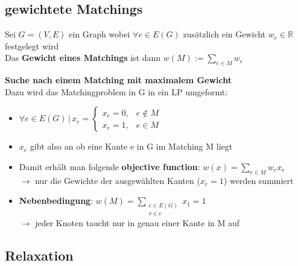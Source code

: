 \documentclass[12pt,a4paper]{article}
\begin{document}
\subsection{gewichtete Matchings}
Sei $G=(V,E)$ ein Graph wobei $\forall e\in E(G)$ zusätzlich ein Gewicht $w_e \in \mathbb{R}$ festgelegt wird\\
Das \textbf{Gewicht eines Matchings} ist dann $\displaystyle w(M) := \sum_{e\in M} w_e$

\textbf{Suche nach einem Matching mit maximalem Gewicht}\\
Dazu wird das Matchingproblem in G in ein LP umgeformt:
\begin{itemize}
\item $\forall e \in E(G) \, | \, x_e = \begin{cases} x_e = 0, & e \not\in M\\ x_e = 1, & e \in M \end{cases}$
\item $x_e$ gibt also an ob eine Kante e in G im Matching M liegt
\item Damit erhält man folgende \textbf{objective function}: $\displaystyle w(x) = \sum_{e\in M} w_e x_e$\\
$\rightarrow$ nur die Gewichte der ausgewählten Kanten ($x_e = 1$) werden summiert
\item \textbf{Nebenbedingung}: $\displaystyle w(M) = \sum_{\substack{e\in E(G)\\ v\in e}} x_1 = 1$\\
$\rightarrow$ jeder Knoten taucht nur in genau einer Kante in M auf
\end{itemize}

\subsection{Relaxation}
\end{document}

